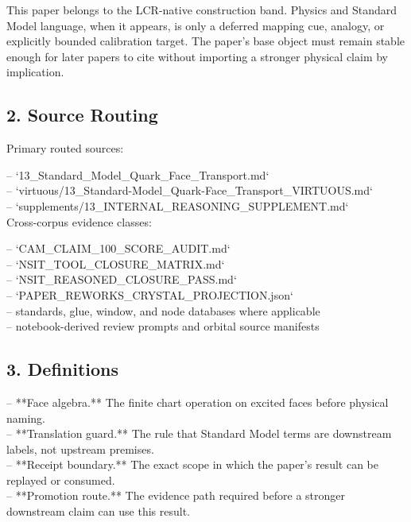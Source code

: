 \documentclass[11pt]{article}
\begin{document}
This paper belongs to the LCR-native construction band. Physics and Standard Model language, when it appears, is only a deferred mapping cue, analogy, or explicitly bounded calibration target. The paper's base object must remain stable enough for later papers to cite without importing a stronger physical claim by implication.

\subsection*{2. Source Routing}

Primary routed sources:

\noindent{}-- `13\_Standard\_Model\_Quark\_Face\_Transport.md`\\
\noindent{}-- `virtuous/13\_Standard-Model\_Quark-Face\_Transport\_VIRTUOUS.md`\\
\noindent{}-- `supplements/13\_INTERNAL\_REASONING\_SUPPLEMENT.md`\\

Cross-corpus evidence classes:

\noindent{}-- `CAM\_CLAIM\_100\_SCORE\_AUDIT.md`\\
\noindent{}-- `NSIT\_TOOL\_CLOSURE\_MATRIX.md`\\
\noindent{}-- `NSIT\_REASONED\_CLOSURE\_PASS.md`\\
\noindent{}-- `PAPER\_REWORKS\_CRYSTAL\_PROJECTION.json`\\
\noindent{}-- standards, glue, window, and node databases where applicable\\
\noindent{}-- notebook-derived review prompts and orbital source manifests\\

\subsection*{3. Definitions}

\noindent{}-- **Face algebra.** The finite chart operation on excited faces before physical naming.\\
\noindent{}-- **Translation guard.** The rule that Standard Model terms are downstream labels, not upstream premises.\\
\noindent{}-- **Receipt boundary.** The exact scope in which the paper's result can be replayed or consumed.\\
\noindent{}-- **Promotion route.** The evidence path required before a stronger downstream claim can use this result.\\
\end{document}
